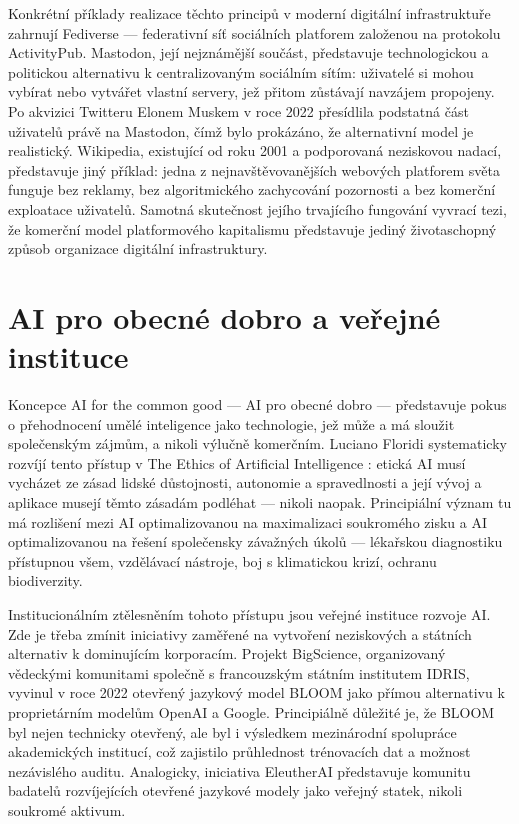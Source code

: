 Konkrétní příklady realizace těchto principů v moderní digitální infrastruktuře zahrnují Fediverse — federativní síť sociálních platforem založenou na protokolu ActivityPub.
Mastodon, její nejznámější součást, představuje technologickou a politickou alternativu k centralizovaným sociálním sítím: uživatelé si mohou vybírat nebo vytvářet vlastní servery, jež přitom zůstávají navzájem propojeny. Po akvizici Twitteru Elonem Muskem v roce 2022 přesídlila podstatná část uživatelů právě na Mastodon, čímž bylo prokázáno, že alternativní model je realistický. Wikipedia, existující od roku 2001 a podporovaná neziskovou nadací, představuje jiný příklad: jedna z nejnavštěvovanějších webových platforem světa funguje bez reklamy, bez algoritmického zachycování pozornosti a bez komerční exploatace uživatelů. Samotná skutečnost jejího trvajícího fungování vyvrací tezi, že komerční model platformového kapitalismu představuje jediný životaschopný způsob organizace digitální infrastruktury.


\section{AI pro obecné dobro a veřejné instituce}

Koncepce AI for the common good — AI pro obecné dobro — představuje pokus o přehodnocení umělé inteligence jako technologie, jež může a má sloužit společenským zájmům, a nikoli výlučně komerčním. Luciano Floridi systematicky rozvíjí tento přístup v The Ethics of Artificial Intelligence \parencite{Floridi23}: etická AI musí vycházet ze zásad lidské důstojnosti, autonomie a spravedlnosti a její vývoj a aplikace musejí těmto zásadám podléhat — nikoli naopak. Principiální význam tu má rozlišení mezi AI optimalizovanou na maximalizaci soukromého zisku a AI optimalizovanou na řešení společensky závažných úkolů — lékařskou diagnostiku přístupnou všem, vzdělávací nástroje, boj s klimatickou krizí, ochranu biodiverzity.

Institucionálním ztělesněním tohoto přístupu jsou veřejné instituce rozvoje AI.
Zde je třeba zmínit iniciativy zaměřené na vytvoření neziskových a státních alternativ k dominujícím korporacím.
Projekt BigScience, organizovaný vědeckými komunitami společně s francouzským státním institutem IDRIS, vyvinul v roce 2022 otevřený jazykový model BLOOM jako přímou alternativu k proprietárním modelům OpenAI a Google.
Principiálně důležité je, že BLOOM byl nejen technicky otevřený, ale byl i výsledkem mezinárodní spolupráce akademických institucí, což zajistilo průhlednost trénovacích dat a možnost nezávislého auditu.
Analogicky, iniciativa EleutherAI představuje komunitu badatelů rozvíjejících otevřené jazykové modely jako veřejný statek, nikoli soukromé aktivum.

